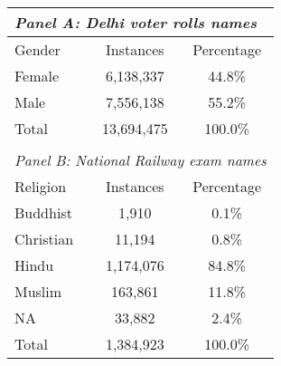 {
\def\sym#1{\ifmmode^{#1}\else\(^{#1}\)\fi}
\begin{tabular}{l*{2}{c}}
\hline\hline
\multicolumn{3}{1}{\textit{Panel A: Delhi voter rolls names}}\\
\hline
Gender&\multicolumn{1}{c}{Instances}&\multicolumn{1}{c}{Percentage}\\
\hline
Female&6,138,337&44.8\% \\
Male&7,556,138&55.2\% \\
\hline
Total&13,694,475&100.0\% \\
\hline
&&\\
\hline\hline
\multicolumn{3}{1}{\textit{Panel B: National Railway exam names}}\\
\hline
Religion&\multicolumn{1}{c}{Instances}&\multicolumn{1}{c}{Percentage}\\
\hline
Buddhist&1,910&0.1\% \\
Christian&11,194&0.8\% \\
Hindu&1,174,076&84.8\% \\
Muslim&163,861&11.8\% \\
NA&33,882&2.4\% \\
\hline
Total&1,384,923&100.0\% \\
\hline
\end{tabular}
}

